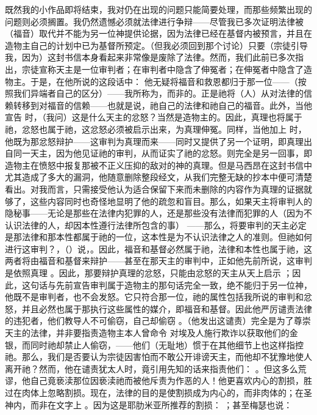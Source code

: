 既然我的小作品即将结束，我对仍在出现的问题只能简要处理，而那些频繁出现的问题则必须搁置。我仍然遗憾必须就法律进行争辩——尽管我已多次证明法律被（福音）取代并不能为另一位神提供论据，因为法律已经在基督内被预言，并且在造物主自己的计划中已为基督所预定。（但我必须回到那个讨论）只要（宗徒引导我，因为）这封书信本身看起来非常像是废除了法律。然而，我们此前已多次指出，宗徒宣称天主是一位审判者；在审判者中隐含了伸冤者；在伸冤者中隐含了造物主。于是，在他所说的这段话中：  他无疑将福音和救恩都归于那一位——（按照我们异端者自己的区分）——我所称为，而非的。正是祂将（人）从对法律的信赖转移到对福音的信赖——也就是说，祂自己的法律和祂自己的福音。此外，当他宣告  时，（我问）这是什么天主的忿怒？当然是造物主的。因此，真理也将属于祂，忿怒也属于祂，这忿怒必须被启示出来，为真理伸冤。同样，当他加上  时，他既为那忿怒辩护——这审判为真理而来——同时又提供了另一个证明，即真理出自同一天主，因为他见证祂的审判，从而证实了祂的忿怒。则完全是另一回事，即造物主在愤怒中报复那被不正义压抑的敌对的神的真理。但是马西昂在这封书信中尤其造成了多大的漏洞，他随意删除整段经文，从我们完整无缺的抄本中便可清楚看出。对我而言，只需接受他认为适合保留下来而未删除的内容作为真理的证据就够了，这些内容同时也奇怪地显明了他的疏忽和盲目。那么，如果天主将审判人的隐秘事——无论是那些在法律内犯罪的人，还是那些没有法律而犯罪的人（因为不认识法律的人，却因本性遵行法律所包含的事） ——那么，将要审判的天主必定是那法律和那本性都属于祂的一位，这本性是为不认识法律之人的准则。但祂如何进行这审判？，（）说，。因此，福音和基督必然属于祂，法律和本性也属于祂，这两者将由福音和基督来辩护——甚至在那天主的审判中，正如他先前所说，这审判是依照真理 。因此，那要辩护真理的忿怒，只能由忿怒的天主从天上启示 ；因此，这句话与先前宣告审判属于造物主的那句话完全一致，绝不能归于另一位神，他既不是审判者，也不会发怒。它只符合那一位，祂的属性包括我所说的审判和忿怒，并且必然也属于那执行这些属性的媒介，即福音和基督。因此他严厉谴责法律的违犯者，他们教导人不可偷窃，自己却偷窃 。（他发出这谴责）完全是为了尊崇天主的法律，并非要指责造物主本人曾命令  对埃及人施行欺诈以获取他们的金银，而同时祂却禁止人偷窃，——他们（无耻地）惯于在其他细节上也这样指控祂。那么，我们是否要认为宗徒因害怕而不敢公开诽谤天主，而他却不犹豫地使人离开祂？然而，他在谴责犹太人时，竟引用先知的话来指责他们： 。但这多么荒谬，他自己竟亵渎那位因亵渎祂而被他斥责为作恶的人！他更喜欢内心的割损，胜过在肉体上忽略割损。现在，法律的目的是使割损成为内心的，而非肉体的；在圣神内，而非在文字上 。因为这是耶肋米亚所推荐的割损： ；甚至梅瑟也说： 